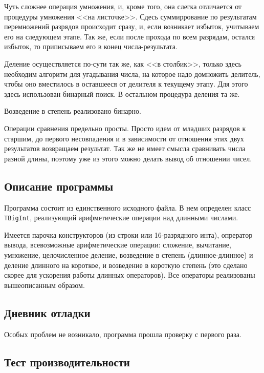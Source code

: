 \documentclass[12pt]{article}
\begin{document}
Чуть сложнее операция умножения, и, кроме того, она слегка отличается от процедуры умножения <<на листочке>>. Сдесь суммиррование по результатам перемножений разрядов происходит сразу, и, если возникает избыток, учитываем его на следующем этапе. Так же, если после прохода по всем разрядам, остался избыток, то приписываем его в конец числа-результата.

Деление осуществляется по-сути так же, как <<в столбик>>, только здесь необходим алгоритм для угадывания числа, на которое надо домножить делитель, чтобы оно вместилось в оставшееся от делителя к текущему этапу. Для этого здесь использован бинарный поиск. В остальном процедура деления та же.

Возведение в степень реализовано бинарно.

Операции сравнения предельно просты. Просто идем от младших разрядов к старшим, до первого несовпадения и в зависимости от отношения этих двух результатов возвращаем результат. Так же не имеет смысла сравнивать числа разной длины, поэтому уже из этого можно делать вывод об отношении чисел.

\subsection*{Описание программы}

Программа состоит из единственного исходного файла. В нем определен класс \verb|TBigInt|, реализующий арифметические операции над длинными числами.

Имеется парочка конструкторов (из строки или 16-разрядного инта), опрератор вывода, всевозможные арифметические операции: сложение, вычитание, умножение, целочисленное деление, возведение в степень (длинное-длинное) и деление длинного на короткое, и возведение в короткую степень (это сделано скорее для ускорения работы длинных операторов). Все операторы реализованы вышеописанным образом.

\subsection*{Дневник отладки}

Особых проблем не возникало, программа прошла проверку с первого раза.

\subsection*{Тест производительности}
\end{document}
